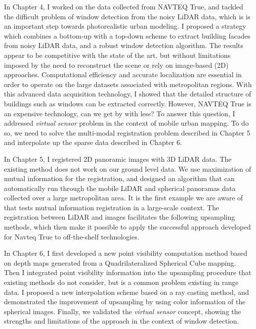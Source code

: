In Chapter 4, I worked on the data collected from NAVTEQ True,
and tackled the difficult problem of window detection from the noisy LiDAR data, which is is an important step towards photorealistic urban modeling. I proposed a strategy which combines a bottom-up with a top-down scheme to extract building facades from noisy LiDAR data, and a robust window detection algorithm. The results
appear to be competitive with the state of the art, but without  limitations imposed by the need to reconstruct the scene or rely
on image-based (2D) approaches. Computational efficiency and accurate localization are essential in order to operate on the large
datasets associated with metropolitan regions. With this advanced data acquisition technology, I showed that the detailed structure of buildings such as windows can be extracted correctly. However, NAVTEQ True is an expensive technology, can we get by with less? To answer this question,  I addressed {\it virtual sensor} problem in the context of mobile urban mapping. To do so,
we need to solve the multi-modal registration problem described in Chapter 5 and interpolate up the sparse data described in Chapter 6. 

In Chapter 5, I registered 2D panoramic images with 3D LiDAR data. The existing method \cite{MastinFisher09} does not work on our ground level data. We use maximization of mutual information
for the registration, and designed an algorithm that can automatically run through the mobile LiDAR and spherical panoramas data collected over a large metropolitan area. It is the first example we are aware of that tests mutual information registration in a large-scale context.  
The registration between LiDAR and images facilitates the following upsampling methods, which then make it possible to apply the successful approach developed for Navteq True to off-the-shelf
technologies.

In Chapter 6, I first developed a new point visibility computation method based on depth maps generated from a Quadrilateralized Spherical Cube mapping. Then I integrated point visibility information into the upsampling procedure that existing methods do not consider, but is a common problem existing in range data. I proposed a new interpolation scheme based on a ray casting method, and demonstrated the improvement of upsampling by using color information of the spherical images. Finally, we validated the {\it virtual sensor} concept, showing the strengths and limitations of the approach in the context of window detection.
 

